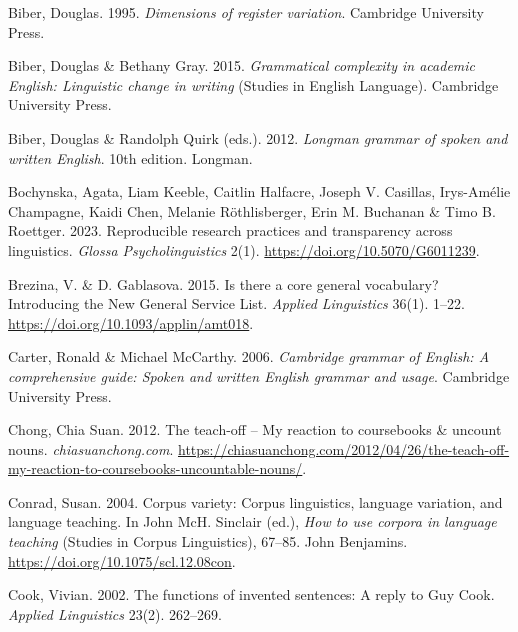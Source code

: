 \documentclass[
  letterpaper,
  DIV=11,
  numbers=noendperiod]{scrreprt}
\newlength{\cslhangindent}
\newenvironment{CSLReferences}[2] %
 {\begin{list}{}{%
  \setlength{\itemindent}{0pt}
  \setlength{\leftmargin}{0pt}
  \setlength{\parsep}{0pt}
  \ifodd #1
   \setlength{\leftmargin}{\cslhangindent}
   \setlength{\itemindent}{-1\cslhangindent}
  \fi
  \setlength{\itemsep}{#2\baselineskip}}}
 {\end{list}}
\begin{document}
\begin{CSLReferences}{1}{0}
Biber, Douglas. 1995. \emph{Dimensions of register variation}. Cambridge
University Press.

Biber, Douglas \& Bethany Gray. 2015. \emph{Grammatical complexity in
academic {English}: {Linguistic} change in writing} (Studies in
{English} Language). Cambridge University Press.

Biber, Douglas \& Randolph Quirk (eds.). 2012. \emph{Longman grammar of
spoken and written {English}}. 10th edition. Longman.

Bochynska, Agata, Liam Keeble, Caitlin Halfacre, Joseph V. Casillas,
Irys-Amélie Champagne, Kaidi Chen, Melanie Röthlisberger, Erin M.
Buchanan \& Timo B. Roettger. 2023. Reproducible research practices and
transparency across linguistics. \emph{Glossa Psycholinguistics} 2(1).
\url{https://doi.org/10.5070/G6011239}.

Brezina, V. \& D. Gablasova. 2015. Is there a core general vocabulary?
Introducing the {New} {General} {Service} {List}. \emph{Applied
Linguistics} 36(1). 1--22. \url{https://doi.org/10.1093/applin/amt018}.

Carter, Ronald \& Michael McCarthy. 2006. \emph{Cambridge grammar of
{English}: A comprehensive guide: Spoken and written {English} grammar
and usage}. Cambridge University Press.

Chong, Chia Suan. 2012. The teach-off -- {My} reaction to coursebooks \&
uncount nouns. \emph{chiasuanchong.com}.
\url{https://chiasuanchong.com/2012/04/26/the-teach-off-my-reaction-to-coursebooks-uncountable-nouns/}.

Conrad, Susan. 2004. Corpus variety: Corpus linguistics, language
variation, and language teaching. In John McH. Sinclair (ed.), \emph{How
to use corpora in language teaching} (Studies in Corpus Linguistics),
67--85. John Benjamins. \url{https://doi.org/10.1075/scl.12.08con}.

Cook, Vivian. 2002. The functions of invented sentences: A reply to
{Guy} {Cook}. \emph{Applied Linguistics} 23(2). 262--269.


\end{CSLReferences}
\end{document}
